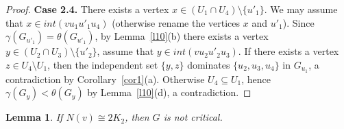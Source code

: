 \documentclass[12pt]{article}
\newtheorem{lemma}{Lemma}
\begin{document}
\begin{proof}
\textbf{Case 2.4.} There exists a vertex $x \in (U_1 \cap U_4) \setminus \{u'_1\}$. We may assume that $x \in int(vu_1u'_1u_4)$ (otherwise rename the vertices $x$ and $u'_1$). Since $\gamma(G_{u'_1}) = \theta(G_{u'_1})$, by Lemma~\ref{l10}(b) there exists a vertex $y \in (U_2 \cap U_3) \setminus \{u'_2\}$, assume that $y \in int(vu_2u'_2u_3)$. If there exists a vertex $z \in U_4 \setminus U_1$, then the independent set $\{y,z\}$ dominates $\{u_2,u_3,u_4\}$ in $G_{u_1}$, a contradiction by Corollary~\ref{cor1}(a). Otherwise $U_4 \subseteq U_1$, hence $\gamma(G_{y}) < \theta(G_{y})$ by Lemma~\ref{l10}(d), a contradiction. 



\end{proof}

\begin{lemma}\label{l26}
If $N(v) \cong 2K_2$, then $G$ is not critical.
\end{lemma}
\end{document}
